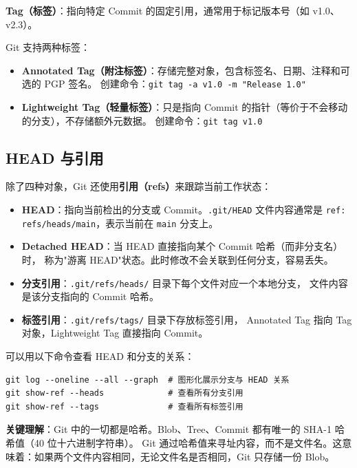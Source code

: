 \documentclass[12pt,a4paper,openany]{ctexbook}
\begin{document}
\medskip
\textbf{Tag（标签）}：指向特定 Commit 的固定引用，通常用于标记版本号（如 v1.0、v2.3）。

Git 支持两种标签：
\begin{itemize}[leftmargin=2em]
  \item \textbf{Annotated Tag（附注标签）}：存储完整对象，包含标签名、日期、注释和可选的 PGP 签名。
        创建命令：\texttt{git tag -a v1.0 -m "Release 1.0"}
  \item \textbf{Lightweight Tag（轻量标签）}：只是指向 Commit 的指针（等价于不会移动的分支），不存储额外元数据。
        创建命令：\texttt{git tag v1.0}
\end{itemize}
\medskip

\subsection{HEAD 与引用}

除了四种对象，Git 还使用\textbf{引用（refs）}来跟踪当前工作状态：

\begin{itemize}[leftmargin=2em]
  \item \textbf{HEAD}：指向当前检出的分支或 Commit。\texttt{.git/HEAD} 文件内容通常是
        \texttt{ref: refs/heads/main}，表示当前在 \texttt{main} 分支上。
  \item \textbf{Detached HEAD}：当 HEAD 直接指向某个 Commit 哈希（而非分支名）时，
        称为"游离 HEAD"状态。此时修改不会关联到任何分支，容易丢失。
  \item \textbf{分支引用}：\texttt{.git/refs/heads/} 目录下每个文件对应一个本地分支，
        文件内容是该分支指向的 Commit 哈希。
  \item \textbf{标签引用}：\texttt{.git/refs/tags/} 目录下存放标签引用，
        Annotated Tag 指向 Tag 对象，Lightweight Tag 直接指向 Commit。
\end{itemize}

可以用以下命令查看 HEAD 和分支的关系：
\begin{lstlisting}[style=shell]
git log --oneline --all --graph  # 图形化展示分支与 HEAD 关系
git show-ref --heads             # 查看所有分支引用
git show-ref --tags              # 查看所有标签引用
\end{lstlisting}

\medskip
\textbf{关键理解}：Git 中的一切都是哈希。Blob、Tree、Commit 都有唯一的 SHA-1 哈希值（40 位十六进制字符串）。
Git 通过哈希值来寻址内容，而不是文件名。这意味着：如果两个文件内容相同，无论文件名是否相同，Git 只存储一份 Blob。
\medskip
\end{document}
